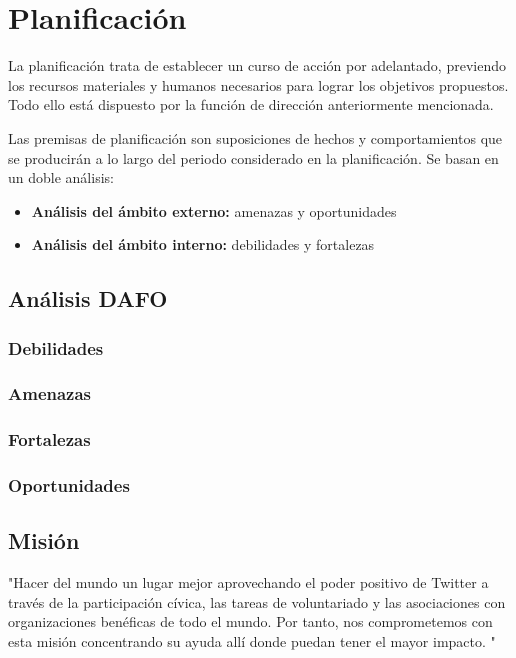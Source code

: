 \section{Planificación}

La planificación trata de establecer un curso de acción por adelantado, previendo los recursos materiales y humanos necesarios para lograr los objetivos propuestos. Todo ello está dispuesto por la función de dirección anteriormente mencionada.

Las premisas de planificación son suposiciones de hechos y comportamientos que se producirán a lo largo del periodo considerado en la planificación. Se basan en un doble análisis: 

\begin{itemize}

\item \textbf{Análisis del ámbito externo:} amenazas y oportunidades
\item \textbf{Análisis del ámbito interno:} debilidades y fortalezas 

\end{itemize}

\subsection{Análisis DAFO}

\subsubsection{Debilidades}

\subsubsection{Amenazas}

\subsubsection{Fortalezas}

\subsubsection{Oportunidades}

\subsection{Misión}

"Hacer del mundo un lugar mejor aprovechando el poder positivo de Twitter a través de la participación cívica, las tareas de voluntariado y las asociaciones con organizaciones benéficas de todo el mundo. Por tanto, nos comprometemos con esta misión concentrando su ayuda allí donde puedan tener el mayor impacto. "

